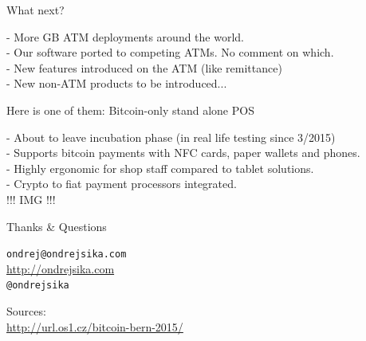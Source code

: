 \documentclass{beamer}
\begin{document}
\begin{frame}

    {\LARGE What next?}\\

    \vspace{5mm}

    - More GB ATM deployments around the world.\\
    - Our software ported to competing ATMs. No comment on which.\\
    - New features introduced on the ATM (like remittance)\\
    - New non-ATM products to be introduced...\\

\end{frame}

\begin{frame}

    {\LARGE Here is one of them: Bitcoin-only stand alone POS}\\

    \vspace{5mm}

    - About to leave incubation phase (in real life testing since 3/2015)\\
    - Supports bitcoin payments with NFC cards, paper wallets and phones.\\
    - Highly ergonomic for shop staff compared to tablet solutions.\\
    - Crypto to fiat payment processors integrated.\\

    !!! IMG !!!  %

\end{frame}

\begin{frame}

    {\LARGE Thanks \& Questions}\\

    \vspace{1cm}

    \texttt{ondrej@ondrejsika.com}\\
    \url{http://ondrejsika.com}\\
    \texttt{@ondrejsika}\\

    \vspace{1cm}

    Sources:\\
    \url{http://url.os1.cz/bitcoin-bern-2015/}
\end{frame}
\end{document}

